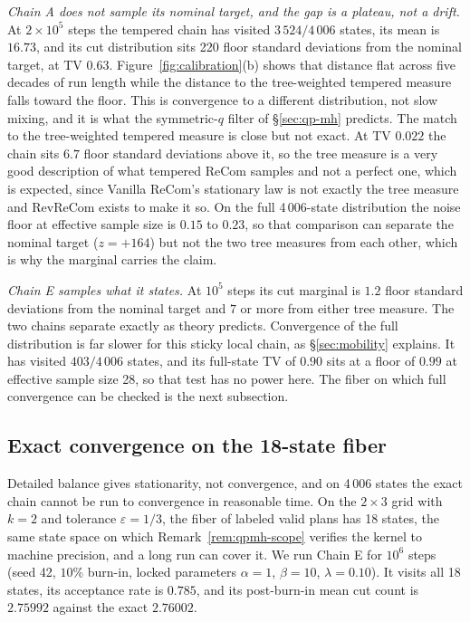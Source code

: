 \documentclass[11pt]{article}
\begin{document}
\emph{Chain A does not sample its nominal target, and the gap is a
plateau, not a drift.} At $2 \times 10^5$ steps the tempered chain
has visited $3\,524/4\,006$ states, its mean is $16.73$, and its cut
distribution sits 220 floor standard deviations from the nominal
target, at TV $0.63$. Figure~\ref{fig:calibration}(b) shows that
distance flat across five decades of run length while the distance
to the tree-weighted tempered measure falls toward the floor. This is
convergence to a different distribution, not slow mixing, and it is
what the symmetric-$q$ filter of \S\ref{sec:qp-mh} predicts. The
match to the tree-weighted tempered measure is close but not exact.
At TV $0.022$ the chain sits $6.7$ floor standard deviations above
it, so the tree measure is a very good description of what tempered
ReCom samples and not a perfect one, which is expected, since Vanilla
ReCom's stationary law is not exactly the tree measure and RevReCom
exists to make it so. On the full 4\,006-state distribution the noise
floor at effective sample size is $0.15$ to $0.23$, so that comparison
can separate the nominal target ($z = +164$) but not the two tree
measures from each other, which is why the marginal carries the
claim.

\emph{Chain E samples what it states.} At $10^5$ steps its cut
marginal is $1.2$ floor standard deviations from the nominal target
and $7$ or more from either tree measure. The two chains separate
exactly as theory predicts. Convergence of the full distribution is
far slower for this sticky local chain, as \S\ref{sec:mobility}
explains. It has visited $403/4\,006$ states, and its full-state TV
of $0.90$ sits at a floor of $0.99$ at effective sample size 28, so
that test has no power here. The fiber on which full convergence can
be checked is the next subsection.

\subsection{Exact convergence on the 18-state fiber}\label{sec:exp-2x3}

Detailed balance gives stationarity, not convergence, and on 4\,006
states the exact chain cannot be run to convergence in reasonable
time. On the $2 \times 3$ grid with $k = 2$ and tolerance
$\varepsilon = 1/3$, the fiber of labeled valid plans has 18 states,
the same state space on which Remark~\ref{rem:qpmh-scope} verifies
the kernel to machine precision, and a long run can cover it. We run
Chain E for $10^6$ steps (seed 42, $10\%$ burn-in, locked parameters
$\alpha = 1$, $\beta = 10$, $\lambda = 0.10$). It visits all 18
states, its acceptance rate is $0.785$, and its post-burn-in mean cut
count is $2.75992$ against the exact $2.76002$.
\end{document}

